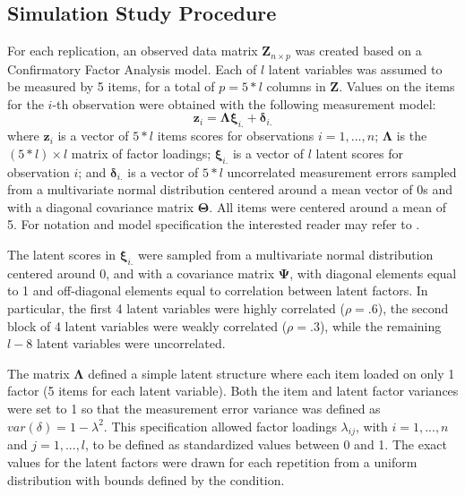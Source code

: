 \FloatBarrier %

\subsection{Simulation Study Procedure}

	For each replication, an observed data matrix $\bm{Z}_{n \times p}$ was created based on a Confirmatory 
	Factor Analysis model.
	Each of $l$ latent variables was assumed to be measured by 5 items, for a total of $p = 5*l$ 
	columns in $\bm{Z}$.
	Values on the items for the $i$-th observation were obtained with the following measurement 
	model:
%
	\begin{equation}
		\bm{z}_i = \bm{\Lambda} \bm{\xi}_{i.} + \bm{\delta}_{i.}
	\end{equation}
%
	where $\bm{z}_i$ is a vector of $5*l$ items scores for observations $i = 1, ..., n$;
	$\bm{\Lambda}$ is the $(5*l) \times l$ matrix of factor loadings; $\bm{\xi}_{i.}$ is a vector of $l$ latent scores 
	for observation $i$; and $\bm{\delta}_{i.}$ is a vector of $5*l$ uncorrelated measurement errors sampled from a 
	multivariate normal distribution centered around a mean vector of 0s and with a diagonal covariance matrix $\bm{\Theta}$.
	All items were centered around a mean of 5.
	For notation and model specification the interested reader may refer to \cite{bollen:1989}.

	The latent scores in $\bm{\xi}_{i.}$ were sampled from a multivariate normal distribution centered around 
	0, and with a covariance matrix $\bm{\Psi}$, with diagonal elements equal to 1 and off-diagonal elements 
	equal to correlation between latent factors. 
	In particular, the first 4 latent variables were highly correlated ($\rho = .6$), the second block of 4 
	latent variables were weakly correlated ($\rho = .3$), while the remaining $l-8$ latent variables were 
	uncorrelated.

	The matrix $\bm{\Lambda}$ defined a simple latent structure where each item loaded on only 1 factor (5 items 
	for each latent variable).
	Both the item and latent factor variances were set to 1 so that the measurement error variance was defined as 
	$var(\delta) = 1 - \lambda^{2}$.
	This specification allowed factor loadings $\lambda_{ij}$, with $i = 1, ..., n$ and $j = 1, ..., l$, to be
	defined as standardized values between 0 and 1.
	The exact values for the latent factors were drawn for each repetition from a uniform distribution 
	with bounds defined by the condition.

